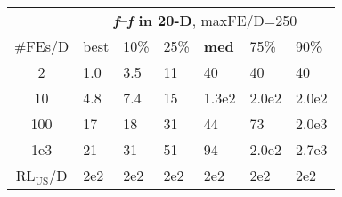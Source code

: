 \begin{tabular}{c|llllll}
 & \multicolumn{6}{|c}{\textbf{\textit{f}\raisebox{-0.35ex}{1}--\textit{f}\raisebox{-0.35ex}{24} in 20-D}, maxFE/D=250}\\
\#FEs/D & best & 10\% & 25\% & \textbf{med} & 75\% & 90\%\\
2 & \hspace*{1ex}1.0 & \hspace*{1ex}3.5 & 11 & 40 & 40 & 40\\
10 & \hspace*{1ex}4.8 & \hspace*{1ex}7.4 & 15 & 1.3e2 & 2.0e2 & 2.0e2\\
100 & 17 & 18 & 31 & 44 & 73 & 2.0e3\\
1e3 & 21 & 31 & 51 & 94 & 2.0e2 & 2.7e3\\
$\text{RL}_{\text{US}}$/D & 2e2 & 2e2 & 2e2 & 2e2 & 2e2 & 2e2
\end{tabular}
